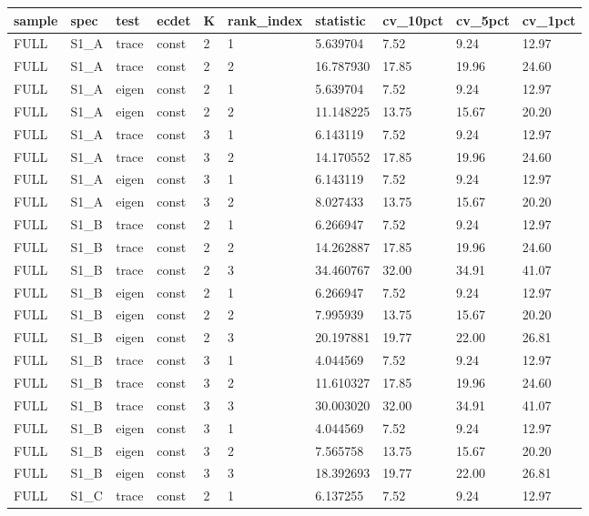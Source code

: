 \begin{tabular}{llllllllll}
\hline
sample & spec & test & ecdet & K & rank\_index & statistic & cv\_10pct & cv\_5pct & cv\_1pct \\
\hline
FULL & S1\_A & trace & const & 2 & 1 & 5.639704 & 7.52 & 9.24 & 12.97 \\
FULL & S1\_A & trace & const & 2 & 2 & 16.787930 & 17.85 & 19.96 & 24.60 \\
FULL & S1\_A & eigen & const & 2 & 1 & 5.639704 & 7.52 & 9.24 & 12.97 \\
FULL & S1\_A & eigen & const & 2 & 2 & 11.148225 & 13.75 & 15.67 & 20.20 \\
FULL & S1\_A & trace & const & 3 & 1 & 6.143119 & 7.52 & 9.24 & 12.97 \\
FULL & S1\_A & trace & const & 3 & 2 & 14.170552 & 17.85 & 19.96 & 24.60 \\
FULL & S1\_A & eigen & const & 3 & 1 & 6.143119 & 7.52 & 9.24 & 12.97 \\
FULL & S1\_A & eigen & const & 3 & 2 & 8.027433 & 13.75 & 15.67 & 20.20 \\
FULL & S1\_B & trace & const & 2 & 1 & 6.266947 & 7.52 & 9.24 & 12.97 \\
FULL & S1\_B & trace & const & 2 & 2 & 14.262887 & 17.85 & 19.96 & 24.60 \\
FULL & S1\_B & trace & const & 2 & 3 & 34.460767 & 32.00 & 34.91 & 41.07 \\
FULL & S1\_B & eigen & const & 2 & 1 & 6.266947 & 7.52 & 9.24 & 12.97 \\
FULL & S1\_B & eigen & const & 2 & 2 & 7.995939 & 13.75 & 15.67 & 20.20 \\
FULL & S1\_B & eigen & const & 2 & 3 & 20.197881 & 19.77 & 22.00 & 26.81 \\
FULL & S1\_B & trace & const & 3 & 1 & 4.044569 & 7.52 & 9.24 & 12.97 \\
FULL & S1\_B & trace & const & 3 & 2 & 11.610327 & 17.85 & 19.96 & 24.60 \\
FULL & S1\_B & trace & const & 3 & 3 & 30.003020 & 32.00 & 34.91 & 41.07 \\
FULL & S1\_B & eigen & const & 3 & 1 & 4.044569 & 7.52 & 9.24 & 12.97 \\
FULL & S1\_B & eigen & const & 3 & 2 & 7.565758 & 13.75 & 15.67 & 20.20 \\
FULL & S1\_B & eigen & const & 3 & 3 & 18.392693 & 19.77 & 22.00 & 26.81 \\
FULL & S1\_C & trace & const & 2 & 1 & 6.137255 & 7.52 & 9.24 & 12.97 \\

\end{tabular}
